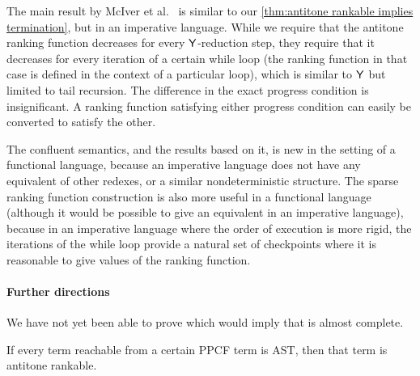 The main result by McIver et al.~\cite{DBLP:journals/pacmpl/McIverMKK18} is similar to our \cref{thm:antitone rankable implies termination}, but in an imperative language. While we require that the antitone ranking function decreases for every $\mathsf{Y}$-reduction step, they require that it decreases for every iteration of a certain while loop (the ranking function in that case is defined in the context of a particular loop), which is similar to $\mathsf{Y}$ but limited to tail recursion. 
The difference in the exact progress condition is insignificant. A ranking function satisfying either progress condition can easily be converted to satisfy the other.

The confluent semantics, and the results based on it, is new in the setting of a functional language, because an imperative language does not have any equivalent of other redexes, or a similar nondeterministic structure. The sparse ranking function construction is also more useful in a functional language (although it would be possible to give an equivalent in an imperative language), because in an imperative language where the order of execution is more rigid, the iterations of the while loop provide a natural set of checkpoints where it is reasonable to give values of the ranking function.

\paragraph*{Further directions} We have not yet been able to prove  which would imply that  is almost complete.
\begin{conjecture}[Completeness]
\label{conj:antitone}
If every term reachable from a certain PPCF term is AST, then that term is antitone rankable.
\end{conjecture}

